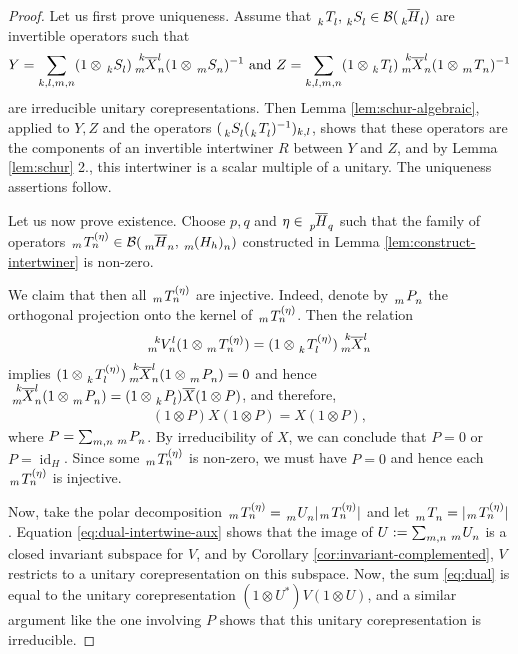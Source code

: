 \documentclass[11pt]{article}
\DeclareMathOperator{\id}{id}
\newcommand{\Gr}[5]{\,\tensor*[^{#2}_{#4}]{#1}{^{#3}_{#5}}}%
\newcommand{\Grd}[3]{\Gr{#1}{}{}{#2}{#3}}
\theoremstyle{definition}
\numberwithin{equation}{section}
\begin{document}
\begin{proof}
Let us first prove uniqueness. Assume that $\Grd{T}{k}{l},\Grd{S}{k}{l} \in
\mathcal{B}(\Grd{\overline{H}}{k}{l})$ are invertible operators such that
\begin{align*}
  Y = \sum_{k,l,m,n} (1\otimes \Grd{S}{k}{l}) \Gr{\overline{X}}{k}{l}{m}{n} (1 \otimes
  \Grd{S}{m}{n})^{-1}  \text{ and }
  Z = \sum_{k,l,m,n} (1\otimes \Grd{T}{k}{l}) \Gr{\overline{X}}{k}{l}{m}{n} (1 \otimes
  \Grd{T}{m}{n})^{-1}
\end{align*}
are irreducible unitary corepresentations. Then Lemma \ref{lem:schur-algebraic}, applied to $Y,Z$
and the operators $(\Grd{S}{k}{l}(\Grd{T}{k}{l})^{-1})_{k,l}$, shows that these operators are the
components of an invertible intertwiner $R$ between $Y$ and $Z$, and by Lemma \ref{lem:schur} 2.,
this intertwiner is a scalar multiple of a unitary. The uniqueness assertions follow.

Let us now prove existence.  Choose $p,q$ and $\eta\in \Grd{\overline{H}}{p}{q}$ such that the
family of operators $\Gr{T}{}{(\eta)}{m}{n} \in
\mathcal{B}(\Grd{\overline{H}}{m}{n},\Grd{(H_{h})}{m}{n})$ constructed in Lemma
\ref{lem:construct-intertwiner} is non-zero.

We claim that then all $\Gr{T}{}{(\eta)}{m}{n}$ are injective.  Indeed, denote by $\Grd{P} {m}{n}$
the orthogonal projection onto the kernel of $\Gr{T}{}{(\eta)}{m}{n}$. Then the relation
\begin{align} \label{eq:dual-intertwine-aux}
  \Gr{V}{k}{l}{m}{n}(1\otimes \Gr{T}{}{(\eta)}{m}{n}) = (1\otimes \Gr{T}{}{(\eta)}{k}{l})\Gr{\overline{X}}{k}{l}{m}{n}
\end{align}
implies $(1\otimes \Gr{T}{}{(\eta)}{k}{l})\Gr{\overline{X}}{k}{l}{m}{n} (1 \otimes \Grd{P}{m}{n}) =
0$ and hence $\Gr{\overline{X}}{k}{l}{m}{n} (1 \otimes \Grd{P}{m}{n}) = (1 \otimes \Grd{P}{k}{l})
\overline{X}(1 \otimes P)$, and therefore,
\begin{align*}
  (1 \otimes P)X(1\otimes P) = X(1\otimes P),
\end{align*}
where $P=\sum_{m,n} \Grd{P}{m}{n}$.  By irreducibility of $X$, we can conclude that $P=0$ or
$P=\id_{H}$. Since some $\Gr{T}{}{(\eta)}{m}{n}$ is non-zero, we must have $P=0$ and hence each $\Gr{T}{}{(\eta)}{m}{n}$ is injective.

Now, take the polar decomposition $\Gr{T}{}{(\eta)}{m}{n}=\Grd{U}{m}{n} |\Gr{T}{}{(\eta)}{m}{n}|$
and let $\Grd{T}{m}{n}=|\Gr{T}{}{(\eta)}{m}{n}|$.   Equation \eqref{eq:dual-intertwine-aux} shows
that the image of $U:=\sum_{m,n} \Grd{U}{m}{n}$ is a closed invariant subspace for $V$, and by Corollary
\ref{cor:invariant-complemented}, $V$ restricts to a unitary corepresentation on this subspace.
Now, the sum \eqref{eq:dual} is equal to the unitary corepresentation $(1\otimes U^{*})V(1\otimes
U)$, and a similar argument like the one involving $P$ shows that this unitary corepresentation is irreducible.
\end{proof}
\end{document}
